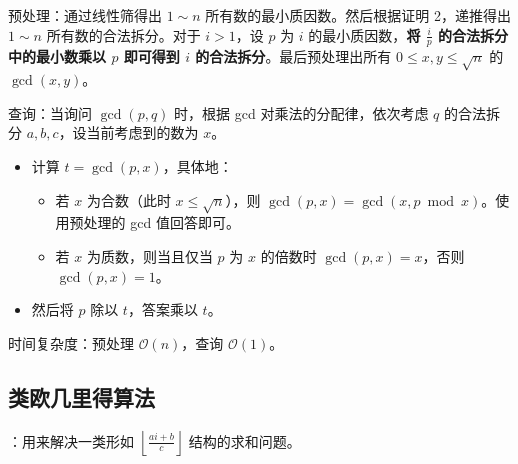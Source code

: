 \Separator{}

预处理：通过线性筛得出 $1 \sim n$ 所有数的最小质因数。然后根据证明 2，递推得出 $1 \sim n$ 所有数的合法拆分。对于 $i > 1$，设 $p$ 为 $i$ 的最小质因数，\textbf{将 $\frac{i}{p}$ 的合法拆分中的最小数乘以 $p$ 即可得到 $i$ 的合法拆分}。最后预处理出所有 $0 \leq x, y \leq \sqrt{n}$ 的 $\gcd(x, y)$。

查询：当询问 $\gcd(p, q)$ 时，根据 gcd 对乘法的分配律，依次考虑 $q$ 的合法拆分 $a, b, c$，设当前考虑到的数为 $x$。

\begin{itemize}
    \item 计算 $t = \gcd(p, x)$，具体地：
    \begin{itemize}
        \item 若 $x$ 为合数（此时 $x \leq \sqrt{n}$），则 $\gcd(p, x) = \gcd(x, p \bmod x)$。使用预处理的 gcd 值回答即可。
        \item 若 $x$ 为质数，则当且仅当 $p$ 为 $x$ 的倍数时 $\gcd(p, x) = x$，否则 $\gcd(p, x) = 1$。
    \end{itemize}
    \item 然后将 $p$ 除以 $t$，答案乘以 $t$。
\end{itemize}

时间复杂度：预处理 $\mathcal{O}(n)$，查询 $\mathcal{O}(1)$。


\subsection{类欧几里得算法}

：用来解决一类形如 $\left\lfloor \frac{ai + b}{c} \right\rfloor$ 结构的求和问题。

